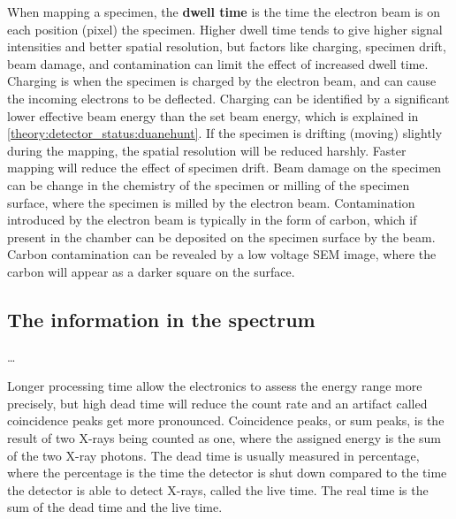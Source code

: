 When mapping a specimen, the \textbf{dwell time} is the time the electron beam is on each position (pixel) the specimen.
Higher dwell time tends to give higher signal intensities and better spatial resolution, but factors like charging, specimen drift, beam damage, and contamination can limit the effect of increased dwell time.
Charging is when the specimen is charged by the electron beam, and can cause the incoming electrons to be deflected.
Charging can be identified by a significant lower effective beam energy than the set beam energy, which is explained in \cref{theory:detector_status:duanehunt}.
If the specimen is drifting (moving) slightly during the mapping, the spatial resolution will be reduced harshly.
Faster mapping will reduce the effect of specimen drift.
Beam damage on the specimen can be change in the chemistry of the specimen or milling of the specimen surface, where the specimen is milled by the electron beam.
Contamination introduced by the electron beam is typically in the form of carbon, which if present in the chamber can be deposited on the specimen surface by the beam.
Carbon contamination can be revealed by a low voltage SEM image, where the carbon will appear as a darker square on the surface.






\clearpage


\subsection{The information in the spectrum}
\label{theory:eds:spectrum_info}

\dots




Longer processing time allow the electronics to assess the energy range more precisely, but high dead time will reduce the count rate and an artifact called coincidence peaks get more pronounced.
Coincidence peaks, or sum peaks, is the result of two X-rays being counted as one, where the assigned energy is the sum of the two X-ray photons.
The dead time is usually measured in percentage, where the percentage is the time the detector is shut down compared to the time the detector is able to detect X-rays, called the live time.
The real time is the sum of the dead time and the live time.








